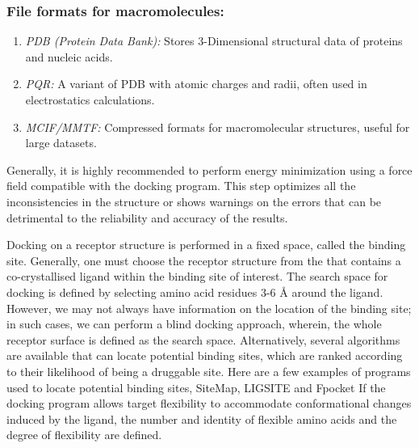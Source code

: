{{\subsubsection*{File formats for macromolecules:}
    \begin{enumerate}
        \item \textit{PDB (Protein Data Bank):} Stores 3-Dimensional structural data of proteins and nucleic acids. 
	       \item \textit{PQR:} A variant of PDB with atomic charges and radii, often used in electrostatics calculations.
	       \item \textit{MCIF/MMTF:} Compressed formats for macromolecular structures, useful for large datasets. 
    \end{enumerate}


Generally, it is highly recommended to perform energy minimization using a force field compatible with the docking program. This step optimizes all the inconsistencies in the structure or shows warnings on the errors that can be detrimental to the reliability and accuracy of the results. 
}}

Docking on a receptor structure is performed in a fixed space, called the binding site. Generally, one must choose the receptor structure from the {\color{red}{wwPDB}} that contains a co-crystallised ligand within the binding site of interest. The search space for docking is defined by selecting amino acid residues 3-6 \r{A} around the ligand.  However, we may not always have information on the location of the binding site; in such cases, we can perform a blind docking approach, wherein, the whole receptor surface is defined as the search space. Alternatively, several algorithms are available that can locate potential binding sites, which are ranked according to their likelihood of being a druggable site. Here are a few examples of programs used to locate potential binding sites, SiteMap\cite{bib7}, LIGSITE \cite{bib8} and Fpocket\cite{bib9} If the docking program allows target flexibility to accommodate conformational changes induced by the ligand, the number and identity of flexible amino acids and the degree of flexibility are defined. 
    
